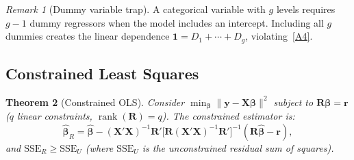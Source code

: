 \documentclass[14pt]{extarticle}
\theoremstyle{plain}
\newtheorem{theorem}{Theorem}[section]
\theoremstyle{definition}
\theoremstyle{remark}
\newtheorem{remark}[theorem]{Remark}
\DeclareMathOperator\rank{rank}
\newcommand{\SSE}{\mathrm{SSE}}
\newcommand{\bX}{\mathbf{X}}
\newcommand{\by}{\mathbf{y}}
\def\bb{\boldsymbol{\beta}}
\newcommand{\bR}{\mathbf{R}}
\newcommand{\br}{\mathbf{r}}
\newcommand{\bone}{\mathbf{1}}
\begin{document}
\begin{remark}[Dummy variable trap]\label{rem:dummy-trap}
A categorical variable with $g$ levels requires $g-1$ dummy regressors when the model includes an intercept. Including all $g$ dummies creates the linear dependence $\bone = D_1 + \cdots + D_g$, violating~\ref{A4}.
\end{remark}

\subsection{Constrained Least Squares}

\begin{theorem}[Constrained OLS]\label{thm:cls}
Consider $\min_{\bb} \|\by - \bX\bb\|^2$ subject to $\bR\bb = \br$ ($q$ linear constraints, $\rank(\bR) = q$). The constrained estimator is:
\begin{equation}\label{eq:cls}
\hat{\bb}_R = \hat{\bb} - (\bX'\bX)^{-1}\bR'\bigl[\bR(\bX'\bX)^{-1}\bR'\bigr]^{-1}(\bR\hat{\bb} - \br),
\end{equation}
and $\SSE_R \geqslant \SSE_U$ (where $\SSE_U$ is the unconstrained residual sum of squares).
\end{theorem}
\end{document}
